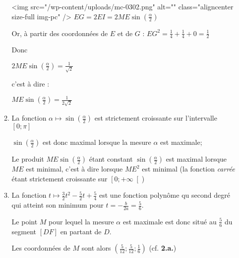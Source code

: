\begin{corrige}
\begin{enumerate}
\begin{enumerate}[label=\alph*.]
\begin{center}
\end{center}
                              <img src="/wp-content/uploads/mc-0302.png" alt="" class="aligncenter size-full  img-pc" />
                              $EG=2 EI=2 ME \sin\left(\frac{ \alpha}{2}\right)$
                              \par
                              Or, à partir des coordonnées de $E$ et de $G$ : $EG^{2}=\frac{1}{4}+\frac{1}{4}+0=\frac{1}{2}$
                              \par
                              Donc
                              \par
                              $2ME \sin \left(\frac{\alpha }{2}\right)=\frac{1}{\sqrt{2}}$
                              \par
                              c'est à dire :
                              \par
                              $ME \sin \left(\frac{\alpha }{2}\right)=\frac{1}{2\sqrt{2}}$
                              \item
                              La fonction $\alpha  \mapsto  \sin\left(\frac{\alpha}{2}\right)$ est strictement croissante sur l'intervalle $\left[0; \pi \right]$
                              \par
                              $\sin\left(\frac{\alpha}{2}\right)$ est donc maximal lorsque la mesure $\alpha $ est maximale;
                              \par
                              Le produit $ME \sin \left(\frac{\alpha }{2}\right)$ étant constant  $\sin \left(\frac{\alpha }{2}\right)$ est maximal lorsque $ME$ est minimal, c'est à dire lorsque $ME^{2}$ est minimal (la fonction \textit{carrée} étant strictement croissante sur $\left[0;+\infty \right[$)
                              \item
                              La fonction $t \mapsto  \frac{3}{2}t^{2}-\frac{5}{2}t+\frac{5}{4}$ est une fonction polynôme qu second degré qui atteint son minimum pour $t=-\frac{b}{2a}=\frac{5}{6}$.
                              \par
                              Le point $M$ pour lequel la mesure $\alpha $ est maximale est donc situé au $\frac{5}{6}$ du segment $\left[DF\right]$ en partant de $D$.
                              \par
                              Les coordonnées de $M$ sont alors $\left(\frac{5}{12};\frac{5}{12};\frac{1}{6}\right)$ (cf. \textbf{2.a.})
                         \end{enumerate}
                    \end{enumerate}
          \end{corrige}
